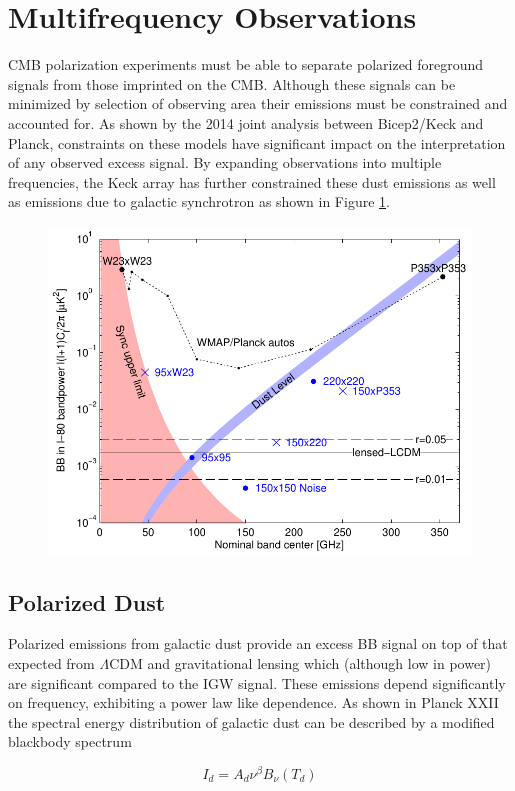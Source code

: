 \documentclass[12pt]{article}
\begin{document}
\section{Multifrequency Observations}

CMB polarization experiments must be able to separate polarized foreground
signals from those imprinted on the CMB. Although these signals can be
minimized by selection of observing area their emissions must be constrained
and accounted for. As shown by the 2014 joint analysis between Bicep2/Keck and
Planck, constraints on these models have significant impact on the
interpretation of any observed excess signal. By expanding observations into
multiple frequencies, the Keck array has further constrained these dust
emissions as well as emissions due to galactic synchrotron as shown in Figure
\ref{fig:noilev}.
\begin{figure}
	\center
	\includegraphics[width=.8\textwidth]{noilev_bk15.pdf}
	\caption{}
	\label{fig:noilev}
\end{figure}

\subsection{Polarized Dust}
Polarized emissions from galactic dust provide an excess BB signal on top of
that expected from $\Lambda$CDM and gravitational lensing which (although low
in power) are significant compared to the IGW signal. These emissions depend
significantly on frequency, exhibiting a power law like dependence. As shown
in Planck XXII \cite{cite:PlanckXXII} the spectral energy distribution of
galactic dust can be described by a modified blackbody spectrum

\begin{equation}
	I_d=A_d\nu ^\beta B_{\nu}(T_d)
	\label{eq:dust_sed}
\end{equation}
\end{document}
